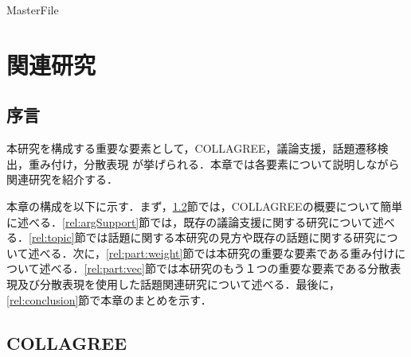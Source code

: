 \expandafter\ifx\csname MasterFile\endcsname\relax
	\def\SubFile{hoge}
	
	
	\setcounter{chapter}{1}
  \fi
  \cleardoublepage
\chapter{関連研究}
\label{relwork:chapter}

\section{序言}
\label{relwork:introduction}
本研究を構成する重要な要素として，COLLAGREE，議論支援，話題遷移検出，重み付け，分散表現 が挙げられる．本章では各要素について説明しながら関連研究を紹介する．


本章の構成を以下に示す．まず，\ref{rel:collagree}節では，COLLAGREEの概要について簡単に述べる．\ref{rel:argSupport}節では，既存の議論支援に関する研究について述べる．\ref{rel:topic}節では話題に関する本研究の見方や既存の話題に関する研究について述べる．次に，\ref{rel:part:weight}節では本研究の重要な要素である重み付けについて述べる．\ref{rel:part:vec}節では本研究のもう１つの重要な要素である分散表現及び分散表現を使用した話題関連研究について述べる．最後に，\ref{rel:conclusion}節で本章のまとめを示す．

\clearpage
\section{COLLAGREE}
\label{rel:collagree}
